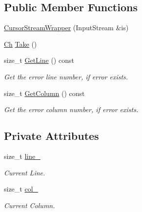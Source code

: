 \subsection*{Public Member Functions}
\begin{DoxyCompactItemize}
\item 
\mbox{\hyperlink{classrapidjson_1_1_cursor_stream_wrapper_a3aaa212b6e82a7862242fccab52625bd}{Cursor\+Stream\+Wrapper}} (Input\+Stream \&is)
\item 
\mbox{\hyperlink{classrapidjson_1_1_cursor_stream_wrapper_a49421838afb7b754a756193896e8273b}{Ch}} \mbox{\hyperlink{classrapidjson_1_1_cursor_stream_wrapper_af553de16f25ee449e213eb16e0955d38}{Take}} ()
\item 
size\+\_\+t \mbox{\hyperlink{classrapidjson_1_1_cursor_stream_wrapper_a97c6cbbd334911639fe522bbfdd350b7}{Get\+Line}} () const
\begin{DoxyCompactList}\small\item\em Get the error line number, if error exists. \end{DoxyCompactList}\item 
size\+\_\+t \mbox{\hyperlink{classrapidjson_1_1_cursor_stream_wrapper_a33002632924bb10108077a22c6aa108d}{Get\+Column}} () const
\begin{DoxyCompactList}\small\item\em Get the error column number, if error exists. \end{DoxyCompactList}\end{DoxyCompactItemize}
\subsection*{Private Attributes}
\begin{DoxyCompactItemize}
\item 
size\+\_\+t \mbox{\hyperlink{classrapidjson_1_1_cursor_stream_wrapper_a45092cee2d910ac2bfb479794d5a46ef}{line\+\_\+}}
\begin{DoxyCompactList}\small\item\em Current Line. \end{DoxyCompactList}\item 
size\+\_\+t \mbox{\hyperlink{classrapidjson_1_1_cursor_stream_wrapper_aac18faf6a4d396ddb8b4dfcc04107752}{col\+\_\+}}
\begin{DoxyCompactList}\small\item\em Current Column. \end{DoxyCompactList}\end{DoxyCompactItemize}
